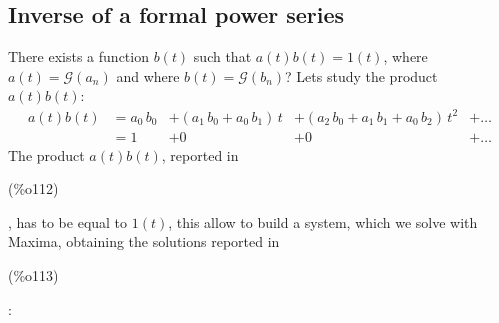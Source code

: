 \subsection{Inverse of a formal power series}


There exists a function $b(t)$ such that $a(t)b(t)=1(t)$, where $a(t)
= \mathcal{G} (a_n)$ and where $b(t) = \mathcal{G} (b_n)$? Lets study
the product $a(t)b(t)$:
\begin{displaymath}
  \begin{split}
    a(t)b(t) &= {a}_{0}\,{b}_{0}&+\left(
      {a}_{1}\,{b}_{0}+{a}_{0}\,{b}_{1}\right) \,t&+\left(
      {a}_{2}\,{b}_{0}+{a}_{1}\,{b}_{1}+{a}_{0}\,{b}_{2}\right)
    \,{t}^{2}&+ \ldots\\
    &= 1 &+ 0 &+ 0 &+ \ldots
  \end{split}
\end{displaymath}
The product $ a(t)b(t)$, reported
in \parbox{8ex}{\color{labelcolor}(\%o112) }, has to be equal to
$1(t)$, this allow to build a system, which we solve with Maxima,
obtaining the solutions reported
in \parbox{8ex}{\color{labelcolor}(\%o113) }:

